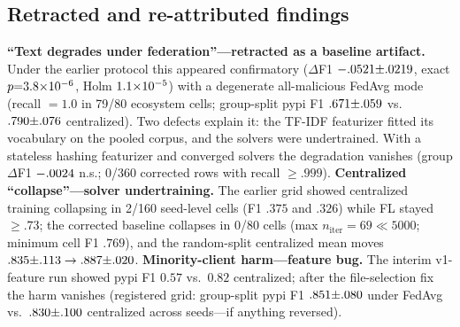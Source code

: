 \documentclass[sigconf,nonacm]{acmart}
\begin{document}
\subsection{Retracted and re-attributed findings}
\textbf{``Text degrades under federation''---retracted as a baseline
artifact.} Under the earlier protocol this appeared confirmatory
($\Delta$F1 $-.0521{\pm}.0219$, exact
$p{=}3.8{\times}10^{-6}$, Holm $1.1{\times}10^{-5}$) with a
degenerate all-malicious FedAvg mode (recall $=1.0$ in 79/80 ecosystem
cells; group-split pypi F1 $.671{\pm}.059$
vs.\ $.790{\pm}.076$
centralized). Two defects explain it: the TF-IDF featurizer fitted its
vocabulary on the pooled corpus, and the solvers were undertrained. With
a stateless hashing featurizer and converged solvers the degradation
vanishes (group $\Delta$F1 $-.0024$ n.s.; 0/360 corrected
rows with recall ${\geq}.999$).
\textbf{Centralized ``collapse''---solver undertraining.} The earlier
grid showed centralized training collapsing in 2/160 seed-level cells
(F1 $.375$ and $.326$) while FL stayed ${\geq}.73$; the corrected
baseline collapses in 0/80 cells (max $n_{\mathrm{iter}}{=}69\ll5000$;
minimum cell F1 $.769$), and the random-split centralized mean moves
$.835{\pm}.113\to
.887{\pm}.020$.
\textbf{Minority-client harm---feature bug.} The interim v1-feature run
showed pypi F1 $0.57$ vs.\ $0.82$ centralized; after the file-selection
fix the harm vanishes (registered grid: group-split pypi F1
$.851{\pm}.080$ under FedAvg vs.\
$.830{\pm}.100$ centralized
across seeds---if anything reversed).
\end{document}
